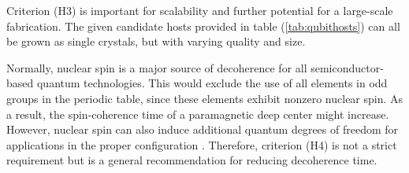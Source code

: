 \begin{table}[!ht]
\centering
\noindent{}
\caption{Table taken from \citeauthor{Gordon2013} \cite{Gordon2013} that lists a number of tetrahedrally coordinated hosts whose band gaps are larger than $2.0$ (eV), and compares it to diamond and Si. All experimental values are from Ref. \cite{Martienssen2005}, except for where explicity cited otherwise. }
\label{tab:qubithosts}
\end{table}

Criterion (H3) is important for scalability and further potential for a large-scale fabrication. The given candidate hosts provided in table (\autoref{tab:qubithosts}) can all be grown as single crystals, but with varying quality and size.

\noindent Normally, nuclear spin is a major source of decoherence for all semiconductor-based quantum technologies. This would exclude the use of all elements in odd groups in the periodic table, since these elements exhibit nonzero nuclear spin. As a result, the spin-coherence time of a paramagnetic deep center \cite{Weber2010} might increase. However, nuclear spin can also induce additional quantum degrees of freedom for applications in the proper configuration \cite{Bassett2019}. Therefore, criterion (H4) is not a strict requirement but is a general recommendation for reducing decoherence time.  %

